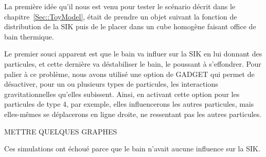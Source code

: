 La première idée qu'il nous est venu pour tester le scénario décrit dans le
chapitre~\ref{Sec::ToyModel}, était de prendre un objet suivant la fonction de
distribution de la SIK puis de le placer dans un cube homogène faisant office de
bain thermique.

Le premier souci apparent est que le bain va influer sur la SIK en lui donnant
des particules, et cette dernière va déstabiliser le bain, le poussant à
s'effondrer. Pour palier à ce problème, nous avons utilisé une option de
\textsc{GADGET} qui permet de désactiver, pour un ou plusieurs types de
particules, les interactions gravitationnelles qu'elles subissent.
Ainsi, en activant cette option pour les particules de type 4, par exemple,
elles influencerons les autres particules, mais elles-mêmes se déplacerons en
ligne droite, ne ressentant pas les autres particules.

METTRE QUELQUES GRAPHES

Ces simulations ont échoué parce que le bain n'avait aucune influence sur la
SIK.
